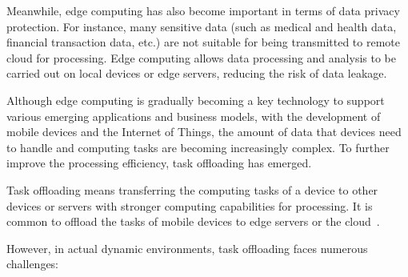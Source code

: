 \documentclass[journal]{IEEEtran}
\begin{document}
Meanwhile, edge computing has also become important in terms of data privacy protection. 
For instance, many sensitive data (such as medical and health data, financial transaction data, etc.) are not suitable 
for being transmitted to remote cloud for processing. 
Edge computing allows data processing and analysis to be carried out on local devices or edge servers, reducing the risk of data leakage.

Although edge computing is gradually becoming a key technology to support various emerging applications and business models, 
with the development of mobile devices and the Internet of Things, 
the amount of data that devices need to handle and computing tasks are becoming increasingly complex. 
To further improve the processing efficiency, task offloading has emerged.

Task offloading means transferring the computing tasks of a device to other devices or 
servers with stronger computing capabilities for processing. 
It is common to offload the tasks of mobile devices to edge servers or the cloud~\cite{7762913}.

However, in actual dynamic environments, task offloading faces numerous challenges:
\end{document}
